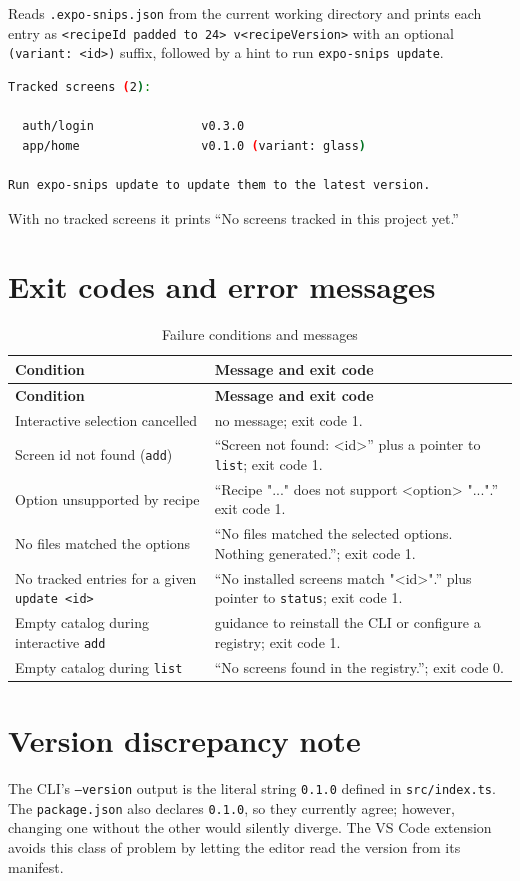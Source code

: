 Reads \texttt{.expo-snips.json} from the current working directory and prints each
entry as \texttt{<recipeId padded to 24> v<recipeVersion>} with an optional
\texttt{(variant: <id>)} suffix, followed by a hint to run
\texttt{expo-snips update}.

\begin{lstlisting}[language=bash]
Tracked screens (2):

  auth/login               v0.3.0
  app/home                 v0.1.0 (variant: glass)

Run expo-snips update to update them to the latest version.
\end{lstlisting}

With no tracked screens it prints ``No screens tracked in this project yet.''

\section{Exit codes and error messages}

\begin{longtable}{@{}L{4.4cm}L{9.6cm}@{}}
\caption{Failure conditions and messages}\\
\toprule
\textbf{Condition} & \textbf{Message and exit code} \\
\midrule
\endfirsthead
\toprule
\textbf{Condition} & \textbf{Message and exit code} \\
\midrule
\endhead
Interactive selection cancelled & no message; exit code 1. \\
Screen id not found (\texttt{add}) & ``Screen not found: <id>'' plus a pointer to
\texttt{list}; exit code 1. \\
Option unsupported by recipe & ``Recipe "..." does not support <option> "...".''
exit code 1. \\
No files matched the options & ``No files matched the selected options. Nothing
generated.''; exit code 1. \\
No tracked entries for a given \texttt{update <id>} & ``No installed screens match
"<id>".'' plus pointer to \texttt{status}; exit code 1. \\
Empty catalog during interactive \texttt{add} & guidance to reinstall the CLI or
configure a registry; exit code 1. \\
Empty catalog during \texttt{list} & ``No screens found in the registry.''; exit code 0. \\
\bottomrule
\end{longtable}

\label{sec:list-empty}

\section{Version discrepancy note}

The CLI's \texttt{--version} output is the literal string \texttt{0.1.0} defined in
\texttt{src/index.ts}. The \texttt{package.json} also declares \texttt{0.1.0}, so
they currently agree; however, changing one without the other would silently
diverge. The VS Code extension avoids this class of problem by letting the editor
read the version from its manifest.
